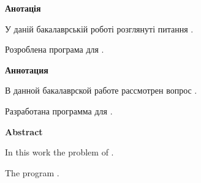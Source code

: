 
\newcommand{\abstracttile}[1]{%
\begingroup%
\centering\fontsize{18pt}{20pt}\selectfont\textbf{#1}\par%
\endgroup}

\thispagestyle{empty}
\abstracttile{Анотація}
У даній бакалаврській роботі розглянуті питання \TBD.

Розроблена програма для \TBD.

\abstracttile{Аннотация}
В данной бакалаврской работе рассмотрен вопрос \TBD.

Разработана программа для \TBD.

\abstracttile{Abstract}
In this work the problem of \TBD.

The program \TBD.
